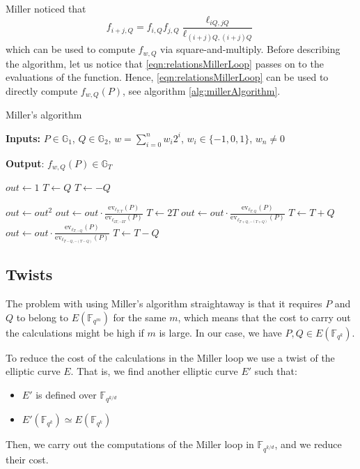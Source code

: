 \documentclass{article}
\newcommand{\gOne}{\mathbb{G}_1}
\newcommand{\gTwo}{\mathbb{G}_2}
\newcommand{\gT}{\mathbb{G}_T}
\newcommand{\ev}{\mathrm{ev}}
\newcommand{\fq}[1]{\mathbb{F}_{q^{#1}}}
\theoremstyle{remark}
\theoremstyle{plain}
\begin{document}
Miller noticed that 
\begin{equation}
    \label{eqn:relationsMillerLoop}
    f_{i+j,Q} = f_{i,Q} f_{j,Q} \frac{\ell_{iQ,jQ}}{\ell_{(i+j)Q,(i+j)Q}}
\end{equation}
which can be used to compute $f_{w,Q}$ via square-and-multiply.
Before describing the algorithm, let us notice that \eqref{eqn:relationsMillerLoop} passes on to the evaluations of the function.
Hence, \eqref{eqn:relationsMillerLoop} can be used to directly compute $f_{w,Q}(P)$, see algorithm \ref{alg:millerAlgorithm}.

\begin{algorithm}
    \caption{\small Miller's algorithm}\label{alg:millerAlgorithm}
    \textbf{Inputs:} $P \in \gOne$, $Q \in \gTwo$, $w = \sum_{i=0}^n w_i 2^i$, $w_i \in \{-1,0,1\}$, $w_n \neq 0$

    \textbf{Output}: $f_{w,Q}(P) \in \gT$
    \begin{algorithmic}
        \State $out \gets 1$
            \State $T \gets Q$
        \Else
            \State $T \gets -Q$
        \EndIf

        \State $out \gets out^2$
        \State $out \gets out \cdot \frac{\ev_{\ell_{T,T}}(P)}{\ev_{\ell_{2T,-2T}}(P)}$
        \State $T \gets 2T$
            \State $out \gets out \cdot \frac{\ev_{\ell_{T,Q}}(P)}{\ev_{\ell_{T+Q,-(T+Q)}}(P)}$
            \State $T \gets T + Q$
        \Else
            \State $out \gets out \cdot \frac{\ev_{\ell_{T,-Q}}(P)}{\ev_{\ell_{T-Q,-(T-Q)}}(P)}$
            \State $T \gets T - Q$
        \EndIf
        \EndFor
    \end{algorithmic}
\end{algorithm}

\subsection{Twists}

The problem with using Miller's algorithm straightaway is that it requires $P$ and $Q$ to belong to $E(\fq{m})$ for the same $m$, which means that the cost to carry out the calculations might be high if $m$ is large.
In our case, we have $P, Q \in E(\fq{k})$.

To reduce the cost of the calculations in the Miller loop we use a twist of the elliptic curve $E$.
That is, we find another elliptic curve $E'$ such that:
\begin{itemize}
    \item $E'$ is defined over $\fq{k/d}$
    \item $E'(\fq{k}) \simeq E(\fq{k})$
\end{itemize}
Then, we carry out the computations of the Miller loop in $\fq{k/d}$, and we reduce their cost.
\end{document}
